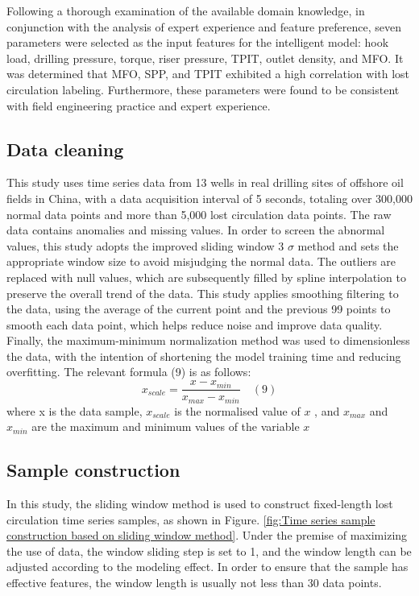 \documentclass[journal,article,submit,pdftex,moreauthors]{Definitions/mdpi}
\begin{document}
Following a thorough examination of the available domain knowledge, in conjunction with the analysis of expert experience and feature preference, seven parameters were selected as the input features for the intelligent model: hook load, drilling pressure, torque, riser pressure, TPIT, outlet density, and MFO. It was determined that MFO, SPP, and TPIT exhibited a high correlation with lost circulation labeling. Furthermore, these parameters were found to be consistent with field engineering practice and expert experience.

\subsection{Data cleaning}
\label{subsec:Data cleaning}
This study uses time series data from 13 wells in real drilling sites of offshore oil fields in China, with a data acquisition interval of 5 seconds, totaling over 300,000 normal data points and more than 5,000 lost circulation data points. The raw data contains anomalies and missing values. In order to screen the abnormal values, this study adopts the improved sliding window 3 \(\sigma\) method and sets the appropriate window size to avoid misjudging the normal data. The outliers are replaced with null values, which are subsequently filled by spline interpolation to preserve the overall trend of the data. This study applies smoothing filtering to the data, using the average of the current point and the previous 99 points to smooth each data point, which helps reduce noise and improve data quality. Finally, the maximum-minimum normalization method was used to dimensionless the data, with the intention of shortening the model training time and reducing overfitting. The relevant formula (9) is as follows:
$$ x _ { s c a l e } = \frac { x - x _ { m i n } } { x _ { m a x } - x _ { m i n } }\quad (9)$$
where x is the data sample, \({{x}_{scale}}\) is the normalised value of \({{x}}\) , and \({{x}_{max}}\) and \({{x}_{min}}\) are the maximum and minimum values of the variable \({{x}}\)
\subsection{Sample construction}

In this study, the sliding window method is used to construct fixed-length lost circulation time series samples, as shown in Figure. \ref{fig:Time series sample construction based on sliding window method}. Under the premise of maximizing the use of data, the window sliding step is set to 1, and the window length can be adjusted according to the modeling effect. In order to ensure that the sample has effective features, the window length is usually not less than 30 data points.
\end{document}
